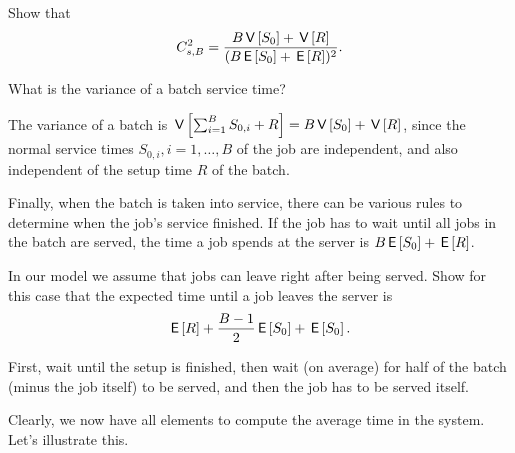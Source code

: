 \begin{exercise}[\faFlask]
Show that
\begin{equation*}
C_{s, B}^2 = \frac{B \,\mathsf{V}\left[S_0\right] + \,\mathsf{V}\left[R\right]}{(B \,\mathsf{E}\left[S_0\right] + \,\mathsf{E}\left[R\right])^2}.
\end{equation*}
\begin{hint}
  What is the variance of a batch service time?
\end{hint}
\begin{solution}
  The variance of a batch is $\,\mathsf{V}\left[\sum_{i=1}^B S_{0,i} + R\right] = B\,\mathsf{V}\left[S_0\right] + \,\mathsf{V}\left[R\right]$, since the normal service times $S_{0,i}, i=1,\ldots, B$ of the job are independent, and also independent of the setup time $R$  of the batch.
\end{solution}
\end{exercise}


Finally, when the batch is taken into service, there can be various rules to determine when the job's service finished. If the job has to wait until all jobs in the batch are served, the time a job spends at the server is $B \,\mathsf{E}\left[S_0\right] + \,\mathsf{E}\left[R\right]$. 

\begin{exercise}[\faFlask]
In our model we assume that jobs can leave right after being served.  Show for this case that the expected time  until a job leaves the server is
\begin{equation*}
\,\mathsf{E}\left[R\right]  + \frac{B-1}{2}\,\mathsf{E}\left[S_0\right] +\,\mathsf{E}\left[S_0\right].
\end{equation*}
\begin{solution}
  First, wait until the setup is finished,  then wait (on average) for half of the batch (minus the job itself) to be served, and then the job has to be served itself.
\end{solution}
\end{exercise}

Clearly, we now have all elements to compute the average time in the system. Let's illustrate this. 

